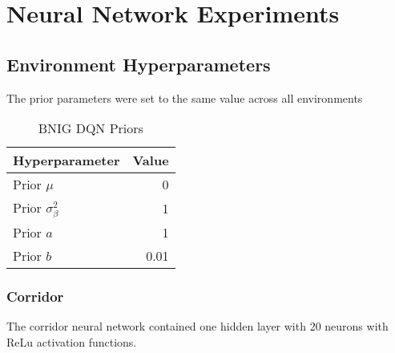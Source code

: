 {{\chapter{Neural Network Experiments}

\section{Environment Hyperparameters}

The prior parameters were set to the same value across all environments


\begin{table}[H]
    \centering
    \begin{tabular}{@{}lr@{}}
        \toprule
        Hyperparameter               & Value \\ \midrule
        Prior $\mu$                  & 0 \\
        Prior $\sigma_\beta^2$       & 1 \\
        Prior $a$                    & 1 \\
        Prior $b$                    & 0.01\\ \bottomrule
    \end{tabular}
    \caption{BNIG DQN Priors}
\end{table}

\subsection{Corridor}

The corridor neural network contained one hidden layer with 20 neurons with ReLu activation functions.

}}
